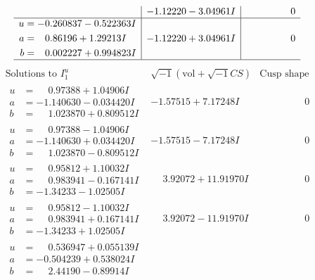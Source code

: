 \documentclass[1p]{elsarticle_modified}
\theoremstyle{definition}
\newcommand{\I}{\sqrt{-1}}
\begin{document}
$$\begin{array}{c|c|c}
 & -1.12220 - 3.04961 I & \phantom{-0.000000 } 0 \\ \hline\begin{aligned}
u &= -0.260837 - 0.522363 I \\
a &= \phantom{-}0.86196 + 1.29213 I \\
b &= \phantom{-}0.002227 + 0.994823 I\end{aligned}
 & -1.12220 + 3.04961 I & \phantom{-0.000000 } 0\\
 \hline 
 \end{array}$$\newpage$$\begin{array}{c|c|c}  
\text{Solutions to }I^u_{1}& \I (\text{vol} + \sqrt{-1}CS) & \text{Cusp shape}\\
 \hline 
\begin{aligned}
u &= \phantom{-}0.97388 + 1.04906 I \\
a &= -1.140630 - 0.034420 I \\
b &= \phantom{-}1.023870 + 0.809512 I\end{aligned}
 & -1.57515 + 7.17248 I & \phantom{-0.000000 } 0 \\ \hline\begin{aligned}
u &= \phantom{-}0.97388 - 1.04906 I \\
a &= -1.140630 + 0.034420 I \\
b &= \phantom{-}1.023870 - 0.809512 I\end{aligned}
 & -1.57515 - 7.17248 I & \phantom{-0.000000 } 0 \\ \hline\begin{aligned}
u &= \phantom{-}0.95812 + 1.10032 I \\
a &= \phantom{-}0.983941 - 0.167141 I \\
b &= -1.34233 - 1.02505 I\end{aligned}
 & \phantom{-}3.92072 + 11.91970 I & \phantom{-0.000000 } 0 \\ \hline\begin{aligned}
u &= \phantom{-}0.95812 - 1.10032 I \\
a &= \phantom{-}0.983941 + 0.167141 I \\
b &= -1.34233 + 1.02505 I\end{aligned}
 & \phantom{-}3.92072 - 11.91970 I & \phantom{-0.000000 } 0 \\ \hline\begin{aligned}
u &= \phantom{-}0.536947 + 0.055139 I \\
a &= -0.504239 + 0.538024 I \\
b &= \phantom{-}2.44190 - 0.89914 I\end{aligned}

\end{array}$$
\end{document}
